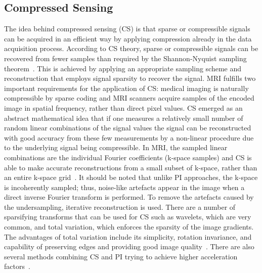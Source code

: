 \documentclass[english,version-2022-01]{uzl-thesis} %
\begin{document}
\subsection{Compressed Sensing}
The idea behind compressed sensing (CS) is that sparse or compressible signals can be acquired in an efficient way by applying compression already in the data acquisition process. According to CS theory, sparse or compressible signals can be recovered from fewer samples than required by the Shannon-Nyquist sampling theorem~\cite{CS-MRI}. This is achieved by applying an appropriate sampling scheme and reconstruction that employs signal sparsity to recover the signal. MRI fulfills two important requirements for the application of CS: medical imaging is naturally compressible by sparse coding and MRI scanners acquire samples of the encoded image in spatial frequency, rather than direct pixel values. CS emerged as an abstract mathematical idea that if one measures a relatively small number of random linear combinations of the signal values the signal can be reconstructed with good accuracy from these few measurements by a non-linear procedure due to the underlying signal being compressible.
In MRI, the sampled linear combinations are the individual Fourier coefficients (k-space samples) and CS is able to make accurate reconstructions from a small subset of k-space, rather than an entire k-space grid~\cite{CS-MRI}. It should be noted that unlike PI approaches, the k-space is incoherently sampled; thus, noise-like artefacts appear in the image when a direct inverse Fourier transform is performed. To remove the artefacts caused by the undersampling, iterative reconstruction is used. There are a number of sparsifying transforms that can be used for CS such as wavelets, which are very common, and total variation, which enforces the sparsity of the image gradients. The advantages of total variation include its simplicity, rotation invariance, and capability of preserving edges and providing good image quality~\cite{PulseSequences}. There are also several methods combining CS and PI trying to achieve higher acceleration factors~\cite{PI+CS, PI+CS2}.
\end{document}
